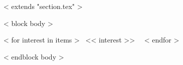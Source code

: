 ~< extends "section.tex" >~

~< block body >~

    ~< for interest in items >~
        << interest >> \textbullet \
    ~< endfor >~


    
~< endblock body >~
